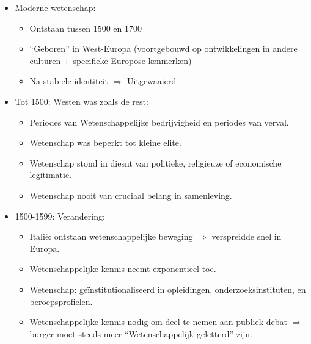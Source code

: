 \documentclass{article}
\begin{document}
    \begin{itemize}
      \item Moderne wetenschap:
      \begin{itemize}
        \item Ontstaan tussen 1500 en 1700
        \item ``Geboren'' in West-Europa (voortgebouwd op ontwikkelingen in andere culturen + specifieke Europose kenmerken)
        \item Na stabiele identiteit $\Rightarrow$ Uitgewaaierd
      \end{itemize}

      \item Tot 1500: Westen was zoals de rest:
      \begin{itemize}
        \item Periodes van Wetenschappelijke bedrijvigheid en periodes van verval.
        \item Wetenschap was beperkt tot kleine elite.
        \item Wetenschap stond in diesnt van politieke, religieuze of economische legitimatie.
        \item Wetenschap nooit van cruciaal belang in samenleving.
      \end{itemize}

      \item 1500-1599: Verandering:
      \begin{itemize}
        \item Itali\"e: ontstaan wetenschappelijke beweging $\Rightarrow$ verspreidde snel in Europa.
        \item Wetenschappelijke kennis neemt exponentieel toe.
        \item Wetenschap: ge\"institutionaliseerd in opleidingen, onderzoeksinstituten, en beroepsprofielen.
        \item Wetenschappelijke kennis nodig om deel te nemen aan publiek debat $\Rightarrow$ burger moet steeds meer ``Wetenschappelijk geletterd'' zijn.
      \end{itemize}


\end{itemize}
\end{document}
